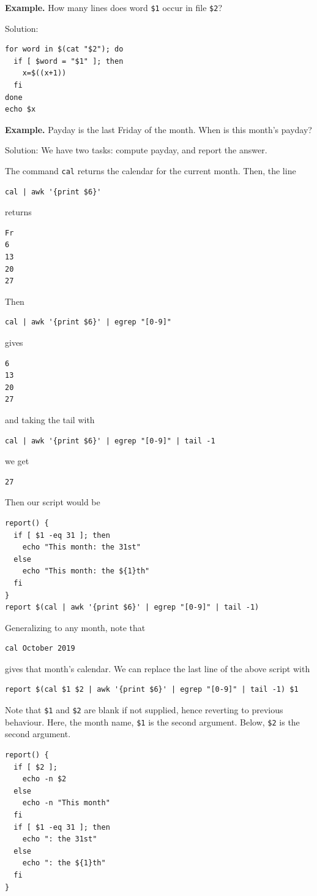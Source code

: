 \documentclass[11pt]{article}
\theoremstyle{definition}
\begin{document}
{\bf Example.} How many lines does word {\tt \$1} occur in file {\tt \$2}?

Solution:
\begin{verbatim}
for word in $(cat "$2"); do
  if [ $word = "$1" ]; then
    x=$((x+1))
  fi
done
echo $x
\end{verbatim}

{\bf Example.} Payday is the last Friday of the month. When is this month's payday?

Solution: We have two tasks: compute payday, and report the answer.

The command {\tt cal} returns the calendar for the current month. Then, the line
\begin{verbatim}
cal | awk '{print $6}'
\end{verbatim}
returns
\begin{verbatim}
Fr
6
13
20
27
\end{verbatim}
Then 
\begin{verbatim}
cal | awk '{print $6}' | egrep "[0-9]"
\end{verbatim}
gives
\begin{verbatim}
6
13
20
27
\end{verbatim}
and taking the tail with 
\begin{verbatim}
cal | awk '{print $6}' | egrep "[0-9]" | tail -1
\end{verbatim}
we get
\begin{verbatim}
27
\end{verbatim}
Then our script would be
\begin{verbatim}
report() {
  if [ $1 -eq 31 ]; then
    echo "This month: the 31st"
  else
    echo "This month: the ${1}th"
  fi
}
report $(cal | awk '{print $6}' | egrep "[0-9]" | tail -1)
\end{verbatim}
Generalizing to any month, note that
\begin{verbatim}
cal October 2019
\end{verbatim}
gives that month's calendar. We can replace the last line of the above script with 
\begin{verbatim}
report $(cal $1 $2 | awk '{print $6}' | egrep "[0-9]" | tail -1) $1
\end{verbatim}
Note that {\tt \$1} and {\tt \$2} are blank if not supplied, hence reverting to previous behaviour. Here, the month name, {\tt \$1} is the second argument. Below, {\tt \$2} is the second argument.
\begin{verbatim}
report() {
  if [ $2 ];
    echo -n $2
  else
    echo -n "This month"
  fi
  if [ $1 -eq 31 ]; then
    echo ": the 31st"
  else
    echo ": the ${1}th"
  fi
}
\end{verbatim}
\end{document}
